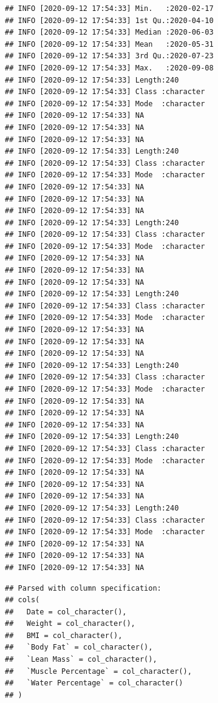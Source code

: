 \documentclass[oneside]{book}
\begin{document}
\begin{verbatim}
## INFO [2020-09-12 17:54:33] Min.   :2020-02-17  
## INFO [2020-09-12 17:54:33] 1st Qu.:2020-04-10  
## INFO [2020-09-12 17:54:33] Median :2020-06-03  
## INFO [2020-09-12 17:54:33] Mean   :2020-05-31  
## INFO [2020-09-12 17:54:33] 3rd Qu.:2020-07-23  
## INFO [2020-09-12 17:54:33] Max.   :2020-09-08  
## INFO [2020-09-12 17:54:33] Length:240        
## INFO [2020-09-12 17:54:33] Class :character  
## INFO [2020-09-12 17:54:33] Mode  :character  
## INFO [2020-09-12 17:54:33] NA
## INFO [2020-09-12 17:54:33] NA
## INFO [2020-09-12 17:54:33] NA
## INFO [2020-09-12 17:54:33] Length:240        
## INFO [2020-09-12 17:54:33] Class :character  
## INFO [2020-09-12 17:54:33] Mode  :character  
## INFO [2020-09-12 17:54:33] NA
## INFO [2020-09-12 17:54:33] NA
## INFO [2020-09-12 17:54:33] NA
## INFO [2020-09-12 17:54:33] Length:240        
## INFO [2020-09-12 17:54:33] Class :character  
## INFO [2020-09-12 17:54:33] Mode  :character  
## INFO [2020-09-12 17:54:33] NA
## INFO [2020-09-12 17:54:33] NA
## INFO [2020-09-12 17:54:33] NA
## INFO [2020-09-12 17:54:33] Length:240        
## INFO [2020-09-12 17:54:33] Class :character  
## INFO [2020-09-12 17:54:33] Mode  :character  
## INFO [2020-09-12 17:54:33] NA
## INFO [2020-09-12 17:54:33] NA
## INFO [2020-09-12 17:54:33] NA
## INFO [2020-09-12 17:54:33] Length:240        
## INFO [2020-09-12 17:54:33] Class :character  
## INFO [2020-09-12 17:54:33] Mode  :character  
## INFO [2020-09-12 17:54:33] NA
## INFO [2020-09-12 17:54:33] NA
## INFO [2020-09-12 17:54:33] NA
## INFO [2020-09-12 17:54:33] Length:240        
## INFO [2020-09-12 17:54:33] Class :character  
## INFO [2020-09-12 17:54:33] Mode  :character  
## INFO [2020-09-12 17:54:33] NA
## INFO [2020-09-12 17:54:33] NA
## INFO [2020-09-12 17:54:33] NA
## INFO [2020-09-12 17:54:33] Length:240        
## INFO [2020-09-12 17:54:33] Class :character  
## INFO [2020-09-12 17:54:33] Mode  :character  
## INFO [2020-09-12 17:54:33] NA
## INFO [2020-09-12 17:54:33] NA
## INFO [2020-09-12 17:54:33] NA
\end{verbatim}

\begin{verbatim}
## Parsed with column specification:
## cols(
##   Date = col_character(),
##   Weight = col_character(),
##   BMI = col_character(),
##   `Body Fat` = col_character(),
##   `Lean Mass` = col_character(),
##   `Muscle Percentage` = col_character(),
##   `Water Percentage` = col_character()
## )
\end{verbatim}
\end{document}
